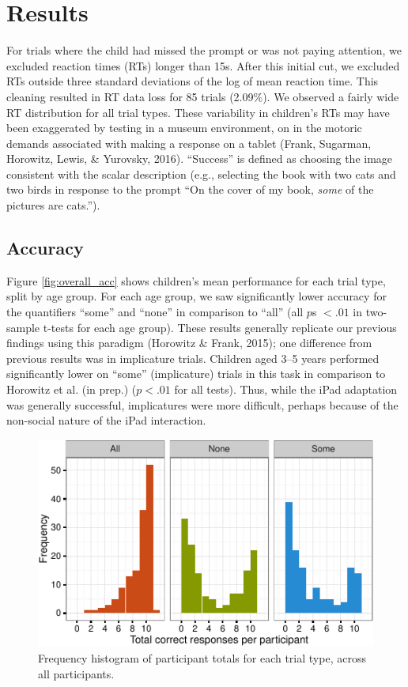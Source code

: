\documentclass[10pt, letterpaper]{article}
\newenvironment{CodeChunk}{}{}
\begin{document}
\section{Results}\label{results}

For trials where the child had missed the prompt or was not paying
attention, we excluded reaction times (RTs) longer than 15s. After this
initial cut, we excluded RTs outside three standard deviations of the
log of mean reaction time. This cleaning resulted in RT data loss for 85
trials (2.09\%). We observed a fairly wide RT distribution for all trial
types. These variability in children's RTs may have been exaggerated by
testing in a museum environment, on in the motoric demands associated
with making a response on a tablet (Frank, Sugarman, Horowitz, Lewis, \&
Yurovsky, 2016). ``Success'' is defined as choosing the image consistent
with the scalar description (e.g., selecting the book with two cats and
two birds in response to the prompt ``On the cover of my book,
\emph{some} of the pictures are cats.'').

\subsection{Accuracy}\label{accuracy}

Figure \ref{fig:overall_acc} shows children's mean performance for each
trial type, split by age group. For each age group, we saw significantly
lower accuracy for the quantifiers ``some'' and ``none'' in comparison
to ``all'' (all \(p\)s \(< .01\) in two-sample t-tests for each age
group). These results generally replicate our previous findings using
this paradigm (Horowitz \& Frank, 2015); one difference from previous
results was in implicature trials. Children aged 3--5 years performed
significantly lower on ``some'' (implicature) trials in this task in
comparison to Horowitz et al. (in prep.) (\(p < .01\) for all tests).
Thus, while the iPad adaptation was generally successful, implicatures
were more difficult, perhaps because of the non-social nature of the
iPad interaction.

\begin{CodeChunk}
\begin{figure}[t]
\includegraphics{figs/diptest-1} \caption[Frequency histogram of participant totals for each trial type, across all participants]{Frequency histogram of participant totals for each trial type, across all participants.}\label{fig:diptest}
\end{figure}
\end{CodeChunk}
\end{document}
